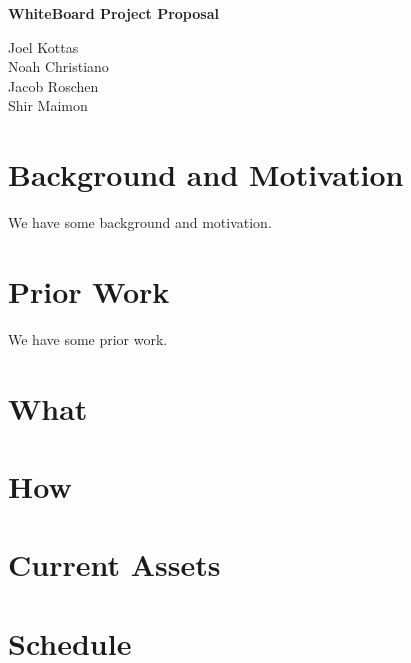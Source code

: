 \documentclass[12pt]{article}
\begin{document}
\huge{\textbf{WhiteBoard Project Proposal}}

\vspace{10 pt}

\large{
    \noindent
    Joel Kottas\\Noah Christiano\\Jacob Roschen\\Shir Maimon
}

\vspace{10 pt}

\section{Background and Motivation}

We have some background and motivation.

\section{Prior Work}

We have some prior work.\cite{Hi}

\section{What}

\section{How}

\section{Current Assets}

\section{Schedule}

{}

\end{document}
